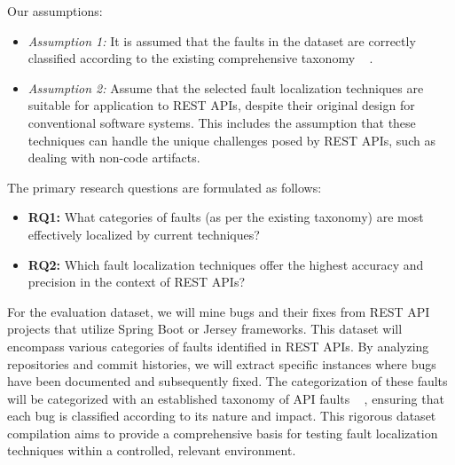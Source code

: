 \documentclass[conference]{IEEEtran}
\newcommand{\todo}[1]{\textcolor{red}{{\bfseries [[#1]]}}}
\begin{document}

    Our assumptions:
    \begin{itemize}
        \item \textit{Assumption 1:} It is assumed that the faults in the dataset are correctly classified according to the existing comprehensive taxonomy ~\cite{automatedTestTaxonomy} .
        \item \textit{Assumption 2:} Assume that the selected fault localization techniques are suitable for application to REST APIs, despite their original design for conventional software systems. This includes the assumption that these techniques can handle the unique challenges posed by REST APIs, such as dealing with non-code artifacts.
    \end{itemize}


    The primary research questions are formulated as follows:
    \begin{itemize}
        \item \textbf{RQ1:} What categories of faults (as per the existing taxonomy) are most effectively localized by current techniques?
        \item \textbf{RQ2:} Which fault localization techniques offer the highest accuracy and precision in the context of REST APIs?
    \end{itemize}

For the evaluation dataset, we will mine bugs and their fixes from REST API projects that utilize Spring Boot or Jersey frameworks. 
This dataset will encompass various categories of faults identified in REST APIs. By analyzing repositories and commit histories, we will extract specific instances where bugs have been documented and subsequently fixed. 
The categorization of these faults will be categorized with an established taxonomy of API faults ~\cite{automatedTestTaxonomy} , ensuring that each bug is classified according to its nature and impact. This rigorous dataset compilation aims to provide a comprehensive basis for testing fault localization techniques within a controlled, relevant environment.
\end{document}
